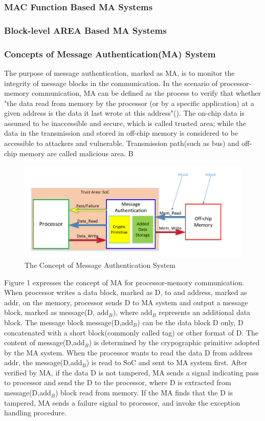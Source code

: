 \documentclass{article}
\begin{document}
\subsubsection{MAC Function Based MA Systems}
\subsubsection{Block-level AREA Based MA Systems}



\subsubsection{Concepts of Message Authentication(MA) System}
The purpose of message authentication, marked as MA, is to monitor the integrity of message blocks in the communication. In the scenario of processor-memory communication, MA can be defined as the process to verify that whether "the data read from memory by the processor (or by a specific application) at a given address is the data it last wrote at this address"(\cite{hm_survey}). The on-chip data is assumed to be inaccessible and secure, which is called trusted area; while the data in the transmission and stored in off-chip memory is considered to be accessible to attackers and vulnerable. Transmission path(such as bus) and off-chip memory are called malicious area. 
B\begin{figure}[htbp]
\centering
\includegraphics[scale=0.4]{./diagrams/MA_concept.pdf}
\caption{The Concept of Message Authentication System}
\label{fig:1 }
\end{figure}

Figure 1 expresses the concept of MA for processor-memory communication. 
When processor writes a data block, marked as D, to and address, marked as addr, on the memory, processor sends D to MA system and output a message block, marked as message(D, add$_B$), where add$_B$ represents an additional data block. The message block message(D,add$_B$) can be the data block D only, D concatenated with a short block(commonly called tag) or other format of D. The content of message(D,add$_B$) is determined by the crypographic primitive adopted by the MA system.
When the processor wants to read the data D from address addr, the message(D,add$_B$) is read to SoC and sent to MA system first. After verified by MA, if the data D is not tampered, MA sends a signal indicating pass to processor and send the D to the processor, where D is extracted from message(D,add$_B$) block read from memory.
If the MA finds that the D is tampered, MA sends a failure signal to processor, and invoke the exception handling procedure.
\end{document}
